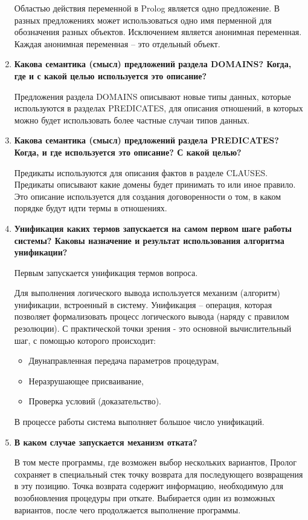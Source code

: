 \begin{enumerate}
        Областью действия переменной в Prolog является одно предложение. В разных предложениях может использоваться одно имя перменной для обозначения разных объектов. Исключением является анонимная переменная. Каждая анонимная переменная -- это отдельный объект.

    \item \textbf{Какова семантика (смысл) предложений раздела DOMAINS?  Когда, где и с какой целью используется это описание?}

        Предложения раздела DOMAINS описывают новые типы данных, которые используются в разделах PREDICATES, для описания отношений, в которых можно будет использовать более частные случаи типов данных.

    \item \textbf{Какова семантика (смысл) предложений раздела PREDICATES? Когда, и где используется это описание? С какой целью?}

        Предикаты используются для описания фактов в разделе CLAUSES. Предикаты описывают какие домены будет принимать то или иное правило. Это описание используется для создания договоренности о том, в каком порядке будут идти термы в отношениях.

    \item \textbf{Унификация каких термов запускается на самом первом шаге работы системы? Каковы назначение и результат использования алгоритма унификации? }

        Первым запускается унификация термов вопроса.

        Для выполнения логического вывода используется механизм (алгоритм) унификации, встроенный в систему. Унификация – операция, которая позволяет формализовать процесс логического вывода (наряду с правилом резолюции). С практической точки зрения - это основной вычислительный шаг, с помощью которого происходит:
        \begin{itemize}
            \item Двунаправленная передача параметров процедурам,
            \item Неразрушающее присваивание,
            \item Проверка условий (доказательство).
        \end{itemize}
        В процессе работы система выполняет большое число унификаций.

    \item \textbf{В каком случае запускается механизм отката?}

        В том месте программы, где возможен выбор нескольких вариантов, Пролог сохраняет в специальный стек точку возврата для последующего возвращения в эту позицию. Точка возврата содержит информацию, необходимую для возобновления процедуры при откате. Выбирается один из возможных вариантов, после чего продолжается выполнение программы.


\end{enumerate}
